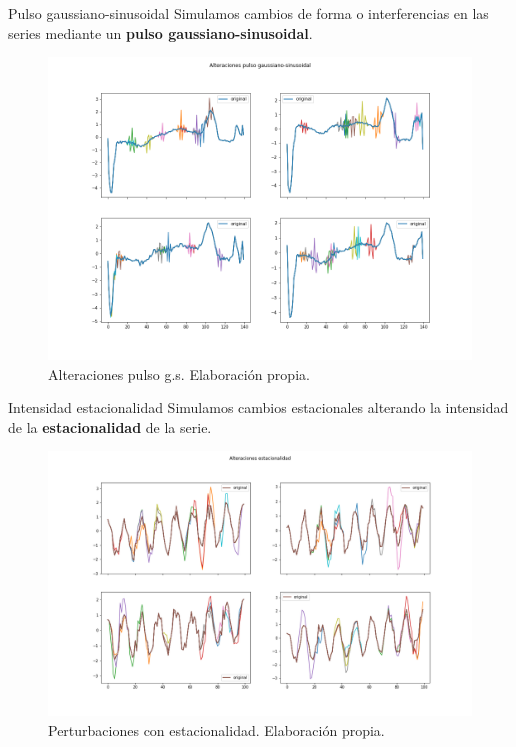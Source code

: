 \documentclass[spanish]{beamer}
\begin{document}
\begin{frame}{Pulso gaussiano-sinusoidal}
  Simulamos cambios de forma o interferencias en las series mediante un \textbf{pulso gaussiano-sinusoidal}.

  \begin{figure}
    \centering
    \includegraphics[width=.8\linewidth]{img/pulso-gaussinus}
    \caption{Alteraciones pulso g.s. Elaboración propia.}
  \end{figure}
\end{frame}

\begin{frame}{Intensidad estacionalidad}
  Simulamos cambios estacionales alterando la intensidad de la \textbf{estacionalidad} de la serie.

  \begin{figure}
    \centering
    \includegraphics[width=.92\linewidth]{img/estacionalidad}
    \caption{Perturbaciones con estacionalidad. Elaboración propia.}
  \end{figure}
\end{frame}
\end{document}
